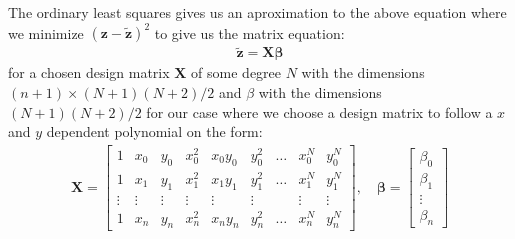 \documentclass[12pt]{article}
\begin{document}
The ordinary least squares gives us an aproximation to the above equation where we minimize $(\boldsymbol{z} - \boldsymbol{\tilde{z}})^2$ to give us the matrix equation:
\begin{align*}
  \boldsymbol{\tilde{z}} = \boldsymbol{X}\boldsymbol{\beta}
\end{align*}
for a chosen design matrix $\boldsymbol{X}$ of some degree $N$ with the dimensions $(n+1)\times (N+1)(N+2)/2$ and $\beta$ with the dimensions $(N+1)(N+2)/2$ for our case where we choose a design matrix to follow a $x$ and $y$ dependent polynomial on the form:
\begin{align*}
  \boldsymbol{X} = \begin{bmatrix}
    1 & x_0 & y_0 & x_0^2 & x_0y_0 & y_0^2 & \hdots &x_0^N & y_0^N \\
    1 & x_1 & y_1 & x_1^2 & x_1y_1 & y_1^2 &\hdots& x_1^N & y_1^N \\
    \vdots & \vdots & \vdots & \vdots & \vdots &\vdots & &\vdots & \vdots \\
    1 & x_n & y_n & x_n^2 & x_ny_n & y_n^2 &\hdots& x_n^N & y_n^N
\end{bmatrix}
, \quad
\boldsymbol{\beta} =
\begin{bmatrix}
  \beta_0 \\
  \beta_1 \\
  \vdots \\
  \beta_n
\end{bmatrix}
\end{align*}
\end{document}
